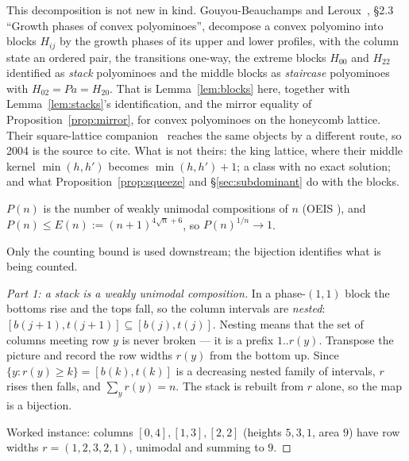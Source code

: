 \documentclass[11pt]{article}
\begin{document}
\begin{remark}[attribution --- 1 of 3]
\label{rem:attr1}
This decomposition is not new in kind. Gouyou-Beauchamps and
Leroux~\cite{gblRoux2004}, \S2.3 ``Growth phases of convex polyominoes'',
decompose a convex polyomino into blocks $H_{ij}$ by the growth phases of its
upper and lower profiles, with the column state an ordered pair, the transitions
one-way, the extreme blocks $H_{00}$ and $H_{22}$ identified as \emph{stack}
polyominoes and the middle blocks as \emph{staircase} polyominoes with
$H_{02} = Pa = H_{20}$. That is Lemma~\ref{lem:blocks} here, together with
Lemma~\ref{lem:stacks}'s identification, and the mirror equality of
Proposition~\ref{prop:mirror}, for convex polyominoes on the honeycomb lattice.
Their square-lattice companion~\cite{lrr1998} reaches the same objects by a
different route, so 2004 is the source to cite. What is not theirs: the king
lattice, where their middle kernel $\min(h,h')$ becomes $\min(h,h')+1$; a class
with no exact solution; and what Proposition~\ref{prop:squeeze} and
\S\ref{sec:subdominant} do with
the blocks.
\end{remark}

\begin{lemma}
\label{lem:stacks}
$P(n)$ is the number of weakly unimodal compositions of $n$ (OEIS
), and $P(n) \le E(n) := (n{+}1)^{4\sqrt n + 6}$, so
$P(n)^{1/n} \to 1$.
\end{lemma}

Only the counting bound is used downstream; the bijection identifies what is
being counted.

\begin{proof}[Part 1: a stack is a weakly unimodal composition]
In a phase-$(1,1)$ block the bottoms rise and the tops fall, so the column
intervals are \emph{nested}: $[b(j{+}1),t(j{+}1)] \subseteq [b(j),t(j)]$.
Nesting means that the set of columns meeting row $y$ is never broken --- it is
a prefix $1..r(y)$. Transpose the picture and record the row widths $r(y)$ from
the bottom up. Since $\{y : r(y) \ge k\} = [b(k),t(k)]$ is a decreasing nested
family of intervals, $r$ rises then falls, and $\sum_y r(y) = n$. The stack is
rebuilt from $r$ alone, so the map is a bijection.

Worked instance: columns $[0,4],[1,3],[2,2]$ (heights $5,3,1$, area $9$) have
row widths $r = (1,2,3,2,1)$, unimodal and summing to $9$.
\end{proof}
\end{document}
